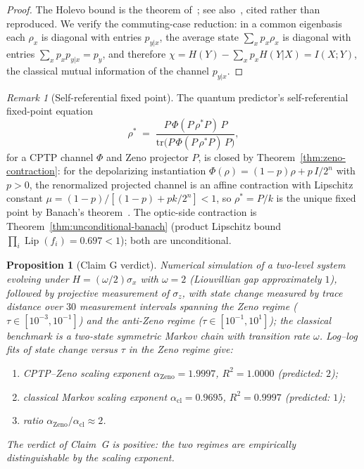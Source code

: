 \documentclass[11pt,a4paper]{article}
\theoremstyle{plain}
\newtheorem{proposition}[theorem]{Proposition}
\theoremstyle{definition}
\theoremstyle{remark}
\newtheorem{remark}[theorem]{Remark}
\DeclareMathOperator{\Lip}{Lip}
\begin{document}
\begin{proof}
The Holevo bound is the theorem of~\cite{holevo1973}; see
also~\cite{nielsen2000}, cited rather than reproduced. We verify
the commuting-case reduction: in a common eigenbasis each
$\rho_x$ is diagonal with entries $p_{y|x}$, the average state
$\sum_xp_x\rho_x$ is diagonal with entries
$\sum_xp_xp_{y|x}=p_y$, and therefore
$\chi=H(Y)-\sum_xp_xH(Y\vert X)=I(X;Y)$, the classical mutual
information of the channel $p_{y|x}$.
\end{proof}

\begin{remark}[Self-referential fixed point]\label{rem:zeno-fixed-point}
The quantum predictor's self-referential fixed-point equation
\begin{equation}\label{eq:zeno-fixed-point}
  \rho^{*} \;=\; \frac{P\,\Phi(P\,\rho^{*}P)\,P}
  {\mathrm{tr}\bigl(P\,\Phi(P\,\rho^{*}P)\,P\bigr)},
\end{equation}
for a CPTP channel $\Phi$ and Zeno projector $P$, is closed by
Theorem~\ref{thm:zeno-contraction}: for the depolarizing
instantiation $\Phi(\rho)=(1-p)\rho+p\,I/2^{n}$ with $p>0$, the
renormalized projected channel is an affine contraction with
Lipschitz constant $\mu=(1-p)/[(1-p)+pk/2^{n}]<1$, so $\rho^{*}=
P/k$ is the unique fixed point by Banach's
theorem~\cite{banach1922}. The optic-side contraction is
Theorem~\ref{thm:unconditional-banach} (product Lipschitz bound
$\prod_i\Lip(f_i)=0.697<1$); both are unconditional.
\end{remark}

\begin{proposition}[Claim G verdict]\label{prop:claimG}
Numerical simulation of a two-level system evolving under
$H=(\omega/2)\sigma_x$ with $\omega=2$ (Liouvillian gap
approximately $1$), followed by projective measurement of
$\sigma_z$, with state change measured by trace distance over $30$
measurement intervals spanning the Zeno regime
($\tau\in[10^{-3},10^{-1}]$) and the anti-Zeno regime
($\tau\in[10^{-1},10^{1}]$); the classical benchmark is a
two-state symmetric Markov chain with transition rate $\omega$.
Log--log fits of state change versus $\tau$ in the Zeno regime
give:
\begin{enumerate}[leftmargin=*,itemsep=2pt]
\item CPTP--Zeno scaling exponent
  $\alpha_{\mathrm{Zeno}}=1.9997$, $R^{2}=1.0000$ (predicted:
  $2$);
\item classical Markov scaling exponent
  $\alpha_{\mathrm{cl}}=0.9695$, $R^{2}=0.9997$ (predicted:
  $1$);
\item ratio $\alpha_{\mathrm{Zeno}}/\alpha_{\mathrm{cl}}\approx2$.
\end{enumerate}
The verdict of Claim~G is positive: the two regimes are
empirically distinguishable by the scaling exponent.
\end{proposition}
\end{document}
